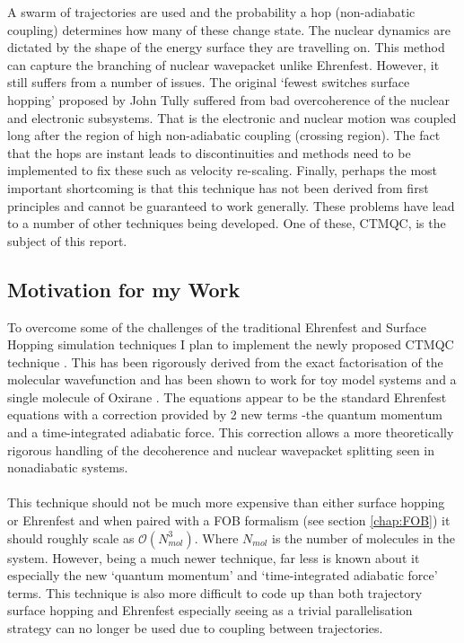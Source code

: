 A swarm of trajectories are used and the probability a hop (non-adiabatic coupling) determines how many of these change state. The nuclear dynamics are dictated by the shape of the energy surface they are travelling on. This method can capture the branching of nuclear wavepacket unlike Ehrenfest. However, it still suffers from a number of issues. The original `fewest switches surface hopping' proposed by John Tully suffered from bad overcoherence of the nuclear and electronic subsystems. That is the electronic and nuclear motion was coupled long after the region of high non-adiabatic coupling (crossing region). The fact that the hops are instant leads to discontinuities and methods need to be implemented to fix these such as velocity re-scaling. Finally, perhaps the most important shortcoming is that this technique has not been derived from first principles and cannot be guaranteed to work generally. These problems have lead to a number of other techniques being developed. One of these, CTMQC, is the subject of this report.

\subsection{Motivation for my Work}
To overcome some of the challenges of the traditional Ehrenfest and Surface Hopping simulation techniques I plan to implement the newly proposed CTMQC technique \cite{agostini_quantum-classical_2016}. This has been rigorously derived from the exact factorisation of the molecular wavefunction \cite{abedi_exact_2010} and has been shown to work for toy model systems and a single molecule of Oxirane \cite{abedi_dynamical_2013, agostini_quantum-classical_2016}. The equations appear to be the standard Ehrenfest equations with a correction provided by 2 new terms -the quantum momentum and a time-integrated adiabatic force. This correction allows a more theoretically rigorous handling of the decoherence and nuclear wavepacket splitting seen in nonadiabatic systems.
\\\\
This technique should not be much more expensive than either surface hopping or Ehrenfest and when paired with a FOB formalism (see section \ref{chap:FOB}) it should roughly scale as $\mathcal{O}(N_{mol}^3)$. Where $N_{mol}$ is the number of molecules in the system. However, being a much newer technique, far less is known about it especially the new `quantum momentum' and `time-integrated adiabatic force' terms. This technique is also more difficult to code up than both trajectory surface hopping and Ehrenfest especially seeing as a trivial parallelisation strategy can no longer be used due to coupling between trajectories.
